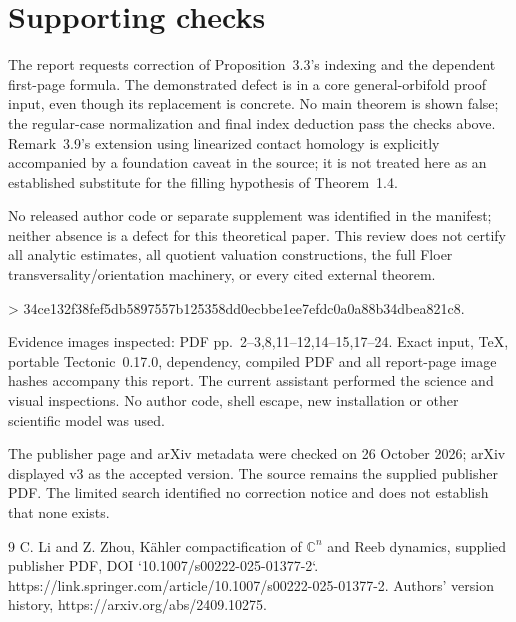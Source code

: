 \documentclass[10pt]{article}
\begin{document}
\section*{Supporting checks}
The report requests correction of Proposition 3.3’s indexing and the dependent first-page formula. The demonstrated defect is in a core general-orbifold proof input, even though its replacement is concrete. No main theorem is shown false; the regular-case normalization and final index deduction pass the checks above. Remark 3.9’s extension using linearized contact homology is explicitly accompanied by a foundation caveat in the source; it is not treated here as an established substitute for the filling hypothesis of Theorem 1.4.\par
No released author code or separate supplement was identified in the manifest; neither absence is a defect for this theoretical paper. This review does not certify all analytic estimates, all quotient valuation constructions, the full Floer transversality/orientation machinery, or every cited external theorem.\par
> 34ce132f38fef5db5897557b125358dd0ecbbe1ee7efdc0a0a88b34dbea821c8.\par
Evidence images inspected: PDF pp. 2–3,8,11–12,14–15,17–24. Exact input, TeX, portable Tectonic 0.17.0, dependency, compiled PDF and all report-page image hashes accompany this report. The current assistant performed the science and visual inspections. No author code, shell escape, new installation or other scientific model was used.\par
The publisher page and arXiv metadata were checked on 26 October 2026; arXiv displayed v3 as the accepted version. The source remains the supplied publisher PDF. The limited search identified no correction notice and does not establish that none exists.\par
9 C. Li and Z. Zhou, Kähler compactification of \(\mathbb C^n\) and Reeb dynamics, supplied publisher PDF, DOI `10.1007/s00222-025-01377-2`. https://link.springer.com/article/10.1007/s00222-025-01377-2. Authors’ version history, https://arxiv.org/abs/2409.10275.\par
\end{document}
